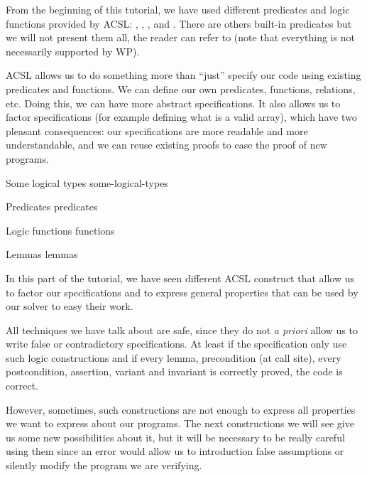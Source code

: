 From the beginning of this tutorial, we have used different predicates
and logic functions provided by ACSL: ,
, ,
 and . There are others
built-in predicates but we will not present them all, the reader can refer to
(note that everything is not necessarily supported by WP).



ACSL allows us to do something more than ``just'' specify our code using
existing predicates and functions. We can define our own predicates,
functions, relations, etc. Doing this, we can have more abstract
specifications. It also allows us to factor specifications (for example
defining what is a valid array), which have two pleasant consequences:
our specifications are more readable and more understandable, and we can
reuse existing proofs to ease the proof of new programs.



\begin{levelTwo}
  {Some logical types}
  {some-logical-types}
\end{levelTwo}

\begin{levelTwo}
  {Predicates}
  {predicates}
\end{levelTwo}

\begin{levelTwo}
  {Logic functions}
  {functions}
\end{levelTwo}

\begin{levelTwo}
  {Lemmas}
  {lemmas}
\end{levelTwo}

\horizontalLine

In this part of the tutorial, we have seen different ACSL construct that
allow us to factor our specifications and to express general properties
that can be used by our solver to easy their work.




All techniques we have talk about are safe, since they do not \emph{a
priori} allow us to write false or contradictory specifications. At
least if the specification only use such logic constructions and if
every lemma, precondition (at call site), every postcondition,
assertion, variant and invariant is correctly proved, the code is
correct.




However, sometimes, such constructions are not enough to express all
properties we want to express about our programs. The next constructions
we will see give us some new possibilities about it, but it will be
necessary to be really careful using them since an error would allow us
to introduction false assumptions or silently modify the program we are
verifying.
